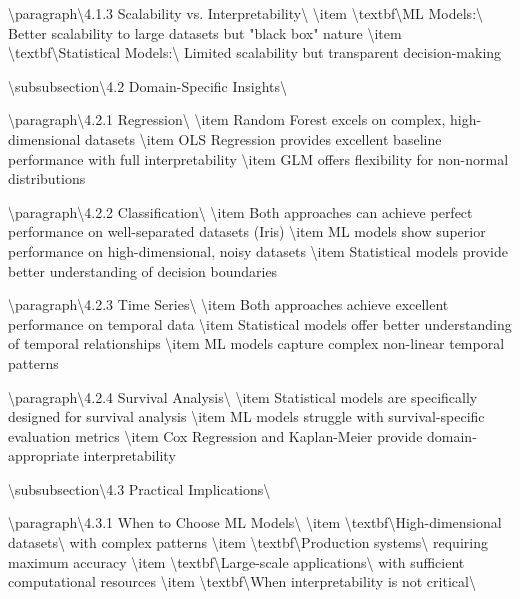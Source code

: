 \documentclass[11pt,a4paper]{article}
\begin{document}
\textbackslash{}paragraph\textbackslash{}{4.1.3 Scalability vs. Interpretability\textbackslash{}}
\textbackslash{}item \textbackslash{}textbf\textbackslash{}{ML Models:\textbackslash{}} Better scalability to large datasets but "black box" nature
\textbackslash{}item \textbackslash{}textbf\textbackslash{}{Statistical Models:\textbackslash{}} Limited scalability but transparent decision-making

\textbackslash{}subsubsection\textbackslash{}{4.2 Domain-Specific Insights\textbackslash{}}

\textbackslash{}paragraph\textbackslash{}{4.2.1 Regression\textbackslash{}}
\textbackslash{}item Random Forest excels on complex, high-dimensional datasets
\textbackslash{}item OLS Regression provides excellent baseline performance with full interpretability
\textbackslash{}item GLM offers flexibility for non-normal distributions

\textbackslash{}paragraph\textbackslash{}{4.2.2 Classification\textbackslash{}}
\textbackslash{}item Both approaches can achieve perfect performance on well-separated datasets (Iris)
\textbackslash{}item ML models show superior performance on high-dimensional, noisy datasets
\textbackslash{}item Statistical models provide better understanding of decision boundaries

\textbackslash{}paragraph\textbackslash{}{4.2.3 Time Series\textbackslash{}}
\textbackslash{}item Both approaches achieve excellent performance on temporal data
\textbackslash{}item Statistical models offer better understanding of temporal relationships
\textbackslash{}item ML models capture complex non-linear temporal patterns

\textbackslash{}paragraph\textbackslash{}{4.2.4 Survival Analysis\textbackslash{}}
\textbackslash{}item Statistical models are specifically designed for survival analysis
\textbackslash{}item ML models struggle with survival-specific evaluation metrics
\textbackslash{}item Cox Regression and Kaplan-Meier provide domain-appropriate interpretability

\textbackslash{}subsubsection\textbackslash{}{4.3 Practical Implications\textbackslash{}}

\textbackslash{}paragraph\textbackslash{}{4.3.1 When to Choose ML Models\textbackslash{}}
\textbackslash{}item \textbackslash{}textbf\textbackslash{}{High-dimensional datasets\textbackslash{}} with complex patterns
\textbackslash{}item \textbackslash{}textbf\textbackslash{}{Production systems\textbackslash{}} requiring maximum accuracy
\textbackslash{}item \textbackslash{}textbf\textbackslash{}{Large-scale applications\textbackslash{}} with sufficient computational resources
\textbackslash{}item \textbackslash{}textbf\textbackslash{}{When interpretability is not critical\textbackslash{}}
\end{document}
